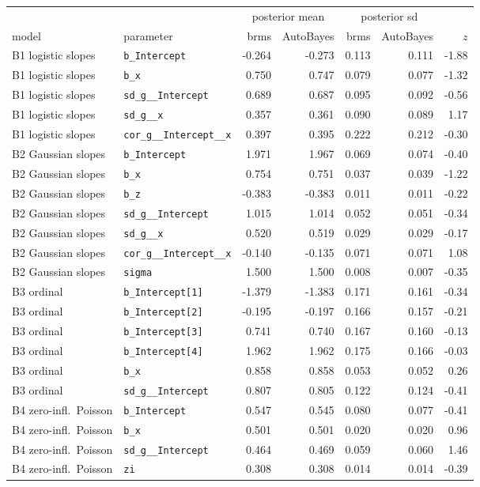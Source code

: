 \documentclass[11pt]{article}
\newcommand{\code}[1]{\texttt{#1}}
\begin{document}
\begin{center}\footnotesize\setlength{\tabcolsep}{4pt}
\begin{tabular}{@{}llrrrrr@{}}
\toprule
& & \multicolumn{2}{c}{posterior mean} & \multicolumn{2}{c}{posterior sd} & \\
model & parameter & brms & AutoBayes & brms & AutoBayes & $z$ \\
\midrule
B1 logistic slopes & \code{b\_Intercept} & -0.264 & -0.273 & 0.113 & 0.111 & -1.88 \\
B1 logistic slopes & \code{b\_x} & 0.750 & 0.747 & 0.079 & 0.077 & -1.32 \\
B1 logistic slopes & \code{sd\_g\_\_Intercept} & 0.689 & 0.687 & 0.095 & 0.092 & -0.56 \\
B1 logistic slopes & \code{sd\_g\_\_x} & 0.357 & 0.361 & 0.090 & 0.089 & 1.17 \\
B1 logistic slopes & \code{cor\_g\_\_Intercept\_\_x} & 0.397 & 0.395 & 0.222 & 0.212 & -0.30 \\
B2 Gaussian slopes & \code{b\_Intercept} & 1.971 & 1.967 & 0.069 & 0.074 & -0.40 \\
B2 Gaussian slopes & \code{b\_x} & 0.754 & 0.751 & 0.037 & 0.039 & -1.22 \\
B2 Gaussian slopes & \code{b\_z} & -0.383 & -0.383 & 0.011 & 0.011 & -0.22 \\
B2 Gaussian slopes & \code{sd\_g\_\_Intercept} & 1.015 & 1.014 & 0.052 & 0.051 & -0.34 \\
B2 Gaussian slopes & \code{sd\_g\_\_x} & 0.520 & 0.519 & 0.029 & 0.029 & -0.17 \\
B2 Gaussian slopes & \code{cor\_g\_\_Intercept\_\_x} & -0.140 & -0.135 & 0.071 & 0.071 & 1.08 \\
B2 Gaussian slopes & \code{sigma} & 1.500 & 1.500 & 0.008 & 0.007 & -0.35 \\
B3 ordinal & \code{b\_Intercept[1]} & -1.379 & -1.383 & 0.171 & 0.161 & -0.34 \\
B3 ordinal & \code{b\_Intercept[2]} & -0.195 & -0.197 & 0.166 & 0.157 & -0.21 \\
B3 ordinal & \code{b\_Intercept[3]} & 0.741 & 0.740 & 0.167 & 0.160 & -0.13 \\
B3 ordinal & \code{b\_Intercept[4]} & 1.962 & 1.962 & 0.175 & 0.166 & -0.03 \\
B3 ordinal & \code{b\_x} & 0.858 & 0.858 & 0.053 & 0.052 & 0.26 \\
B3 ordinal & \code{sd\_g\_\_Intercept} & 0.807 & 0.805 & 0.122 & 0.124 & -0.41 \\
B4 zero-infl.\ Poisson & \code{b\_Intercept} & 0.547 & 0.545 & 0.080 & 0.077 & -0.41 \\
B4 zero-infl.\ Poisson & \code{b\_x} & 0.501 & 0.501 & 0.020 & 0.020 & 0.96 \\
B4 zero-infl.\ Poisson & \code{sd\_g\_\_Intercept} & 0.464 & 0.469 & 0.059 & 0.060 & 1.46 \\
B4 zero-infl.\ Poisson & \code{zi} & 0.308 & 0.308 & 0.014 & 0.014 & -0.39 \\
\bottomrule
\end{tabular}
\end{center}
\end{document}
